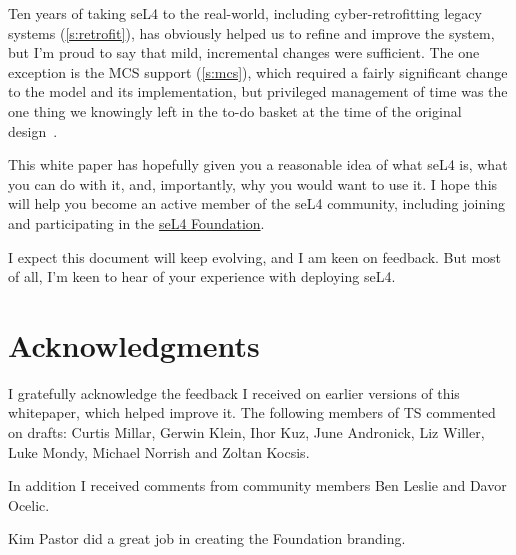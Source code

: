 \documentclass[english,a4paper,12pt\ifDraft,draft\fi]{report}
\newcommand{\Acks}{\section*{Acknowledgments}}
\newcommand{\Acks}{\chapter*{Acknowledgments}}
\begin{document}
  Ten years of taking seL4 to the real-world, including
  cyber-retrofitting legacy systems (\autoref{s:retrofit}), has obviously
  helped us to refine and improve the system, but I'm proud to say that
  mild, incremental changes were sufficient. The one exception is the
  MCS support (\autoref{s:mcs}), which required a fairly significant change
  to the model and its implementation, but privileged management of
  time was the one thing we knowingly left in the to-do basket at
  the time of the original design~\citep{Heiser_Elphinstone_16}.

  This white paper has hopefully given you a reasonable idea of what
  seL4 is, what you can do with it, and, importantly, why you would
  want to use it. I hope this will help you become an active member of
  the seL4 community, including joining and participating in the
  \href{https://sel4.systems/Foundation}{seL4 Foundation}.

  I expect this document will keep evolving, and I am keen on
  feedback. But most of all, I'm keen to hear of your experience with
  deploying seL4.


  \Acks

  I gratefully acknowledge the feedback I received on earlier versions
  of this whitepaper, which helped improve it. The following members of TS commented on drafts:
  Curtis Millar,
  Gerwin Klein,
  Ihor Kuz,
  June Andronick,
  Liz Willer,
  Luke Mondy,
  Michael Norrish and
  Zoltan Kocsis.

  In addition I received comments from community members
  Ben Leslie and
  Davor Ocelic.

  Kim Pastor did a great job in creating the Foundation branding.
  \cleardoublepage
  \sloppy
  
  
\end{document}
